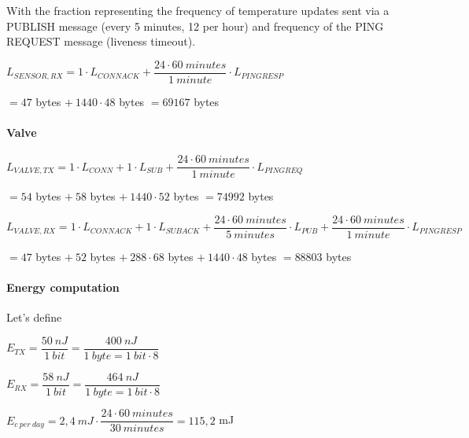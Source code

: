 \documentclass[a4paper,11pt]{article} %
\begin{document}
    \medskip

    With the fraction representing the frequency of temperature updates sent via a \textsc{PUBLISH} message (every 5 minutes, 12 per hour) and frequency of the \textsc{PING REQUEST} message (liveness timeout).

    \medskip

    $L_{SENSOR, RX} = 1 \cdot L_{CONNACK} + \dfrac{24 \cdot 60\ minutes}{1\ minute} \cdot L_{PINGRESP}$

    \medskip

    \qquad \qquad \qquad $= 47$ bytes $+\ 1440 \cdot 48$ bytes $ = 69167$ bytes

    \paragraph{Valve}

    $L_{VALVE, TX} = 1 \cdot L_{CONN} + 1 \cdot L_{SUB} + \dfrac{24 \cdot 60\ minutes}{1\ minute} \cdot L_{PINGREQ}$

    \medskip

    \qquad \qquad \qquad $= 54$ bytes $+\ 58$ bytes $+\ 1440 \cdot 52$ bytes $ = 74992$ bytes

    \medskip

    $L_{VALVE, RX} = 1 \cdot L_{CONNACK} + 1 \cdot L_{SUBACK} + \dfrac{24 \cdot 60\ minutes}{5\ minutes} \cdot L_{PUB} + \dfrac{24 \cdot 60\ minutes}{1\ minute} \cdot L_{PINGRESP}$

    \medskip

    \qquad \qquad \qquad $= 47$ bytes $+\ 52$ bytes $+\ 288 \cdot 68$ bytes $+\ 1440 \cdot 48$ bytes $= 88803$ bytes

    \paragraph{Energy computation}

    Let's define

    \bigskip

    $E_{TX} = \dfrac{50\ nJ}{1\ bit} = \dfrac{400\ nJ}{1\ byte = 1\ bit \cdot 8}$

    \medskip

    $E_{RX} = \dfrac{58\ nJ}{1\ bit} = \dfrac{464\ nJ}{1\ byte = 1\ bit \cdot 8}$

    \medskip

    $E_{c \ per \ day} = 2,4\ mJ \cdot \dfrac{24 \cdot 60\ minutes}{30\ minutes} = 115,2$ mJ

    \bigskip
\end{document}

